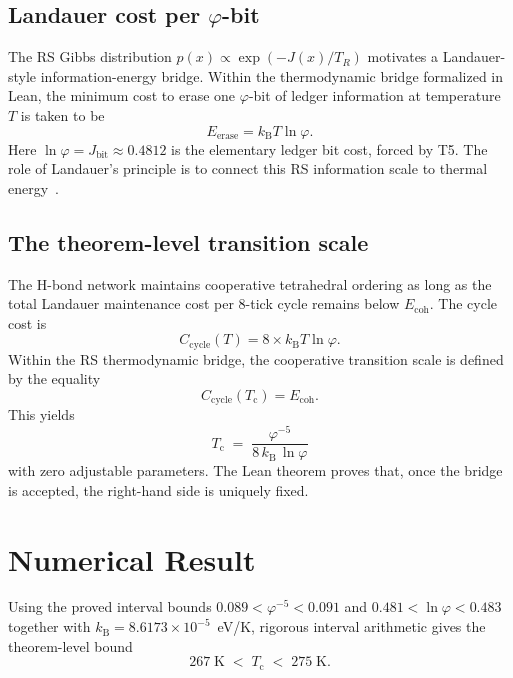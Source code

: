 \documentclass[aps,prl,twocolumn,superscriptaddress,showpacs,floatfix]{revtex4-2}
\newcommand{\Ecoh}{E_{\mathrm{coh}}}
\newcommand{\kB}{k_{\mathrm{B}}}
\newcommand{\Tc}{T_{\mathrm{c}}}
\newcommand{\Jbit}{J_{\mathrm{bit}}}
\newcommand{\phig}{\varphi}
\begin{document}
\subsection{Landauer cost per \texorpdfstring{$\phig$}{phi}-bit}

The RS Gibbs distribution $p(x) \propto \exp(-J(x)/T_R)$ motivates a Landauer-style information-energy bridge.
Within the thermodynamic bridge formalized in Lean, the minimum cost to erase one $\phig$-bit of ledger information at temperature~$T$ is taken to be
\begin{equation}
  E_{\mathrm{erase}} = \kB T \ln \phig.
  \label{eq:landauer}
\end{equation}
Here $\ln\phig = \Jbit \approx 0.4812$ is the elementary ledger bit cost, forced by T5.
The role of Landauer's principle is to connect this RS information scale to thermal energy~\cite{Landauer1961,Berut2012}.

\subsection{The theorem-level transition scale}

The H-bond network maintains cooperative tetrahedral ordering as long as the total Landauer maintenance cost per 8-tick cycle remains below $\Ecoh$.
The cycle cost is
\begin{equation}
  C_{\mathrm{cycle}}(T) = 8 \times \kB T \ln\phig.
  \label{eq:cycle-cost}
\end{equation}
Within the RS thermodynamic bridge, the cooperative transition scale is defined by the equality
\begin{equation}
  C_{\mathrm{cycle}}(\Tc) = \Ecoh.
\end{equation}
This yields
\begin{equation}
  \boxed{\;\Tc \;=\; \frac{\phig^{-5}}{8\,\kB\,\ln\phig}\;}
  \label{eq:Tc}
\end{equation}
with zero adjustable parameters.
The Lean theorem proves that, once the bridge is accepted, the right-hand side is uniquely fixed.

\section{Numerical Result}

Using the proved interval bounds $0.089 < \phig^{-5} < 0.091$ and $0.481 < \ln\phig < 0.483$ together with $\kB = 8.6173 \times 10^{-5}$~eV/K, rigorous interval arithmetic gives the theorem-level bound
\begin{equation}
  267\;\text{K} \;<\; \Tc \;<\; 275\;\text{K}.
  \label{eq:Tc-bounds}
\end{equation}
\end{document}
